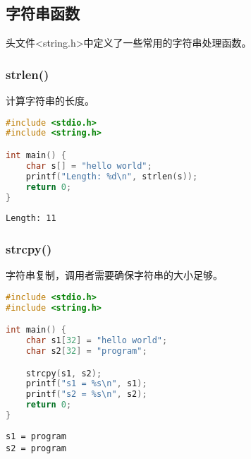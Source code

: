 \vspace{0.5cm}

\subsection{字符串函数}

头文件<string.h>中定义了一些常用的字符串处理函数。

\subsubsection{strlen()}

计算字符串的长度。\\


\begin{lstlisting}[language=C]
#include <stdio.h>
#include <string.h>

int main() {
	char s[] = "hello world";
	printf("Length: %d\n", strlen(s));
	return 0;
}
\end{lstlisting}

\begin{tcolorbox}
	\begin{verbatim}
Length: 11
	\end{verbatim}
\end{tcolorbox}

\vspace{0.5cm}

\subsubsection{strcpy()}

字符串复制，调用者需要确保字符串的大小足够。\\


\begin{lstlisting}[language=C]
#include <stdio.h>
#include <string.h>

int main() {
	char s1[32] = "hello world";
	char s2[32] = "program";

	strcpy(s1, s2);
	printf("s1 = %s\n", s1);
	printf("s2 = %s\n", s2);
	return 0;
}
\end{lstlisting}

\begin{tcolorbox}
	\begin{verbatim}
s1 = program
s2 = program
	\end{verbatim}
\end{tcolorbox}

